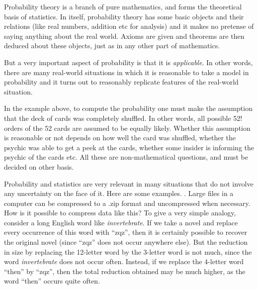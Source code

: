 \documentclass[preprint,  11pt]{amsart}
\begin{document}
\vspace{4mm}
 Probability theory is a branch of pure mathematics, and forms the theoretical basis of statistics. In itself, probability theory has some basic objects and their relations (like real numbers, addition etc for analysis) and it makes no pretense of saying anything about the real world. Axioms are given and theorems are then deduced about these objects, just as in any other part of mathematics. 

But a very important aspect of probability is that it is {\em applicable}. In other words, there are many real-world situations in which it is reasonable to take a model in probability and it turns out to reasonably replicate features of  the real-world situation.

In the example above, to compute the probability one must make the assumption that the deck of cards was completely shuffled. In other words, all possible 52! orders of the 52 cards are assumed to be equally likely. Whether this assumption is reasonable or not depends on how well the card was shuffled, whether the psychic was able to get a peek at the cards, whether some insider is informing the psychic of the cards etc. All these are non-mathematical questions, and must be decided on other basis.

 Probability and statistics are very relevant in many situations that do not involve any uncertainty on the face of it. Here are some examples.
. Large files in a computer can be compressed to a .zip format and uncompressed when necessary. How is it possible to compress data like this? To give a very simple analogy, consider a long English word like {\em invertebrate}. If we take a novel and replace every occurrence of this word with ``zqz'', then  it is certainly possible to recover the original novel (since ``zqz'' does not occur anywhere else). But the reduction in size by replacing the 12-letter word by the 3-letter word is not much, since the word {\em invertebrate} does not occur often. Instead, if we replace the 4-letter word ``then'' by ``zqz'', then the total reduction obtained may be much higher, as the word ``then'' occurs quite often. 
\end{document}
